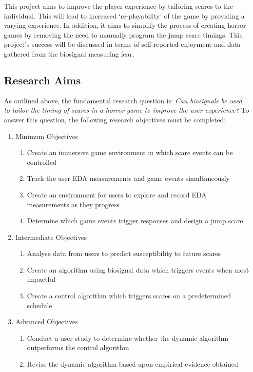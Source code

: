 \documentclass[12pt,a4paper]{article}\usepackage[]{graphicx}\usepackage[]{color}
\begin{document}
This project aims to improve the player experience by tailoring scares to the individual.
This will lead to increased `re-playability' of the game by providing a varying experience.
In addition, it aims to simplify the process of creating horror games by removing the need to manually program the jump scare timings.
This project's success will be discussed in terms of self-reported enjoyment and data gathered from the biosignal measuring fear.

\subsection{Research Aims}
\label{sec:Objectives}

As outlined above, the fundamental research question is: \emph{Can biosignals be used to tailor the timing of scares in a horror game to improve the user experience?}
To answer this question, the following research objectives must be completed:

\begin{enumerate}
	\item Minimum Objectives
	\begin{enumerate}
		\item Create an immersive game environment in which scare events can be controlled
		\item Track the user EDA measurements and game events simultaneously
		\item Create an environment for users to explore and record EDA measurements as they progress
		\item Determine which game events trigger responses and design a jump scare
	\end{enumerate}
	
	\item Intermediate Objectives
	\begin{enumerate}
		\item Analyse data from users to predict susceptibility to future scares
		\item Create an algorithm using biosignal data which triggers events when most impactful
		\item Create a control algorithm which triggers scares on a predetermined schedule
	\end{enumerate}
	
	\item Advanced Objectives
	\begin{enumerate}
		\item Conduct a user study to determine whether the dynamic algorithm outperforms the control algorithm
		\item Revise the dynamic algorithm based upon empirical evidence obtained
	\end{enumerate}
\end{enumerate}
\end{document}
